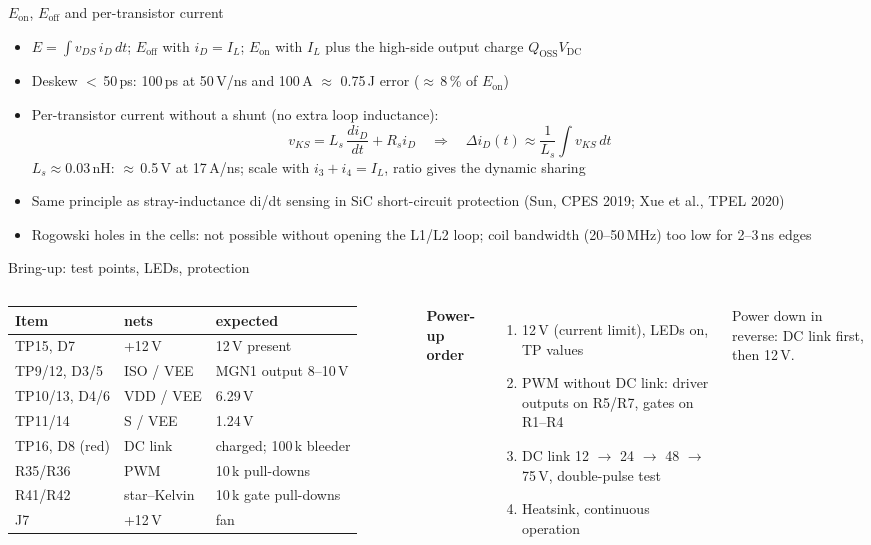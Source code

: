 \documentclass[aspectratio=169,10pt]{beamer}
\begin{document}
\begin{frame}{$E_\mathrm{on}$, $E_\mathrm{off}$ and per-transistor current}
\small
\begin{itemize}
\item $E = \int v_{DS}\, i_D\, dt$; $E_\mathrm{off}$ with $i_D = I_L$; $E_\mathrm{on}$ with $I_L$ plus the high-side output charge $Q_\mathrm{OSS}V_\mathrm{DC}$
\item Deskew $<$\,50\,ps: 100\,ps at 50\,V/ns and 100\,A $\approx$ 0.75\,\textmu J error ($\approx$\,8\,\% of $E_\mathrm{on}$)
\item Per-transistor current without a shunt (no extra loop inductance):
\[ v_{KS} = L_s\,\frac{di_D}{dt} + R_s i_D \quad\Rightarrow\quad \Delta i_D(t) \approx \frac{1}{L_s}\int v_{KS}\,dt \]
$L_s \approx 0.03$\,nH: $\approx$\,0.5\,V at 17\,A/ns; scale with $i_3+i_4 = I_L$, ratio gives the dynamic sharing
\item Same principle as stray-inductance di/dt sensing in SiC short-circuit protection (Sun, CPES 2019; Xue et al., TPEL 2020)
\item Rogowski holes in the cells: not possible without opening the L1/L2 loop; coil bandwidth (20--50\,MHz) too low for 2--3\,ns edges
\end{itemize}
\end{frame}

\begin{frame}{Bring-up: test points, LEDs, protection}
\begin{columns}[T]
\scriptsize
\begin{tabular}{@{}lll@{}}
\toprule
Item & nets & expected \\
\midrule
TP15, D7 & +12\,V & 12\,V present \\
TP9/12, D3/5 & ISO / VEE & MGN1 output 8--10\,V \\
TP10/13, D4/6 & VDD / VEE & 6.29\,V \\
TP11/14 & S / VEE & 1.24\,V \\
TP16, D8 (red) & DC link & charged; 100\,k bleeder \\
R35/R36 & PWM & 10\,k pull-downs \\
R41/R42 & star--Kelvin & 10\,k gate pull-downs \\
J7 & +12\,V & fan \\
\bottomrule
\end{tabular}
\small
\textbf{Power-up order}
\begin{enumerate}\footnotesize
\item 12\,V (current limit), LEDs on, TP values
\item PWM without DC link: driver outputs on R5/R7, gates on R1--R4
\item DC link 12 $\rightarrow$ 24 $\rightarrow$ 48 $\rightarrow$ 75\,V, double-pulse test
\item Heatsink, continuous operation
\end{enumerate}
\footnotesize Power down in reverse: DC link first, then 12\,V.
\end{columns}
\end{frame}
\end{document}

